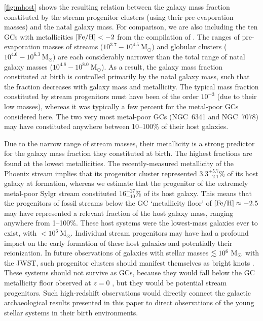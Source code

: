 \documentclass[twocolumn]{aastex63}
\newcommand{\msun}{\ensuremath{\textrm{M}_\odot}}
\begin{document}
\autoref{fig:mhost} shows the resulting relation between the galaxy mass fraction constituted by the stream progenitor clusters (using their pre-evaporation masses) and the natal galaxy mass.
For comparison, we are also including the ten GCs with metallicities $[{\rm Fe}/{\rm H}]<-2$ from the compilation of \citet{kruijssen19e}.
The ranges of pre-evaporation masses of streams ($10^{3.7}{-}10^{4.5}~\msun$) and globular clusters ($10^{4.6}{-}10^{6.3}~\msun$) are each considerably narrower than the total range of natal galaxy masses ($10^{4.8}{-}10^{8.0}~\msun$).
As a result, the galaxy mass fraction constituted at birth is controlled primarily by the natal galaxy mass, such that the fraction decreases with galaxy mass and metallicity.
The typical mass fraction constituted by stream progenitors must have been of the order $10^{-3}$ (due to their low masses), whereas it was typically a few percent for the metal-poor GCs considered here. The two very most metal-poor GCs (NGC~6341 and NGC~7078) may have constituted anywhere between 10--100\% of their host galaxies.

Due to the narrow range of stream masses, their metallicity is a strong predictor for the galaxy mass fraction they constituted at birth.
The highest fractions are found at the lowest metallicities.
The recently-measured metallicity of the Phoenix stream \citep{wan20} implies that its progenitor cluster represented $3.3_{-2.1}^{+5.7}$\% of its host galaxy at formation, whereas we estimate that the progenitor of the extremely metal-poor Sylgr stream \citep{ibata:2019,roederer:2019} constituted $16_{-10}^{+27}$\% of its host galaxy.
This means that the progenitors of fossil streams below the GC `metallicity floor' \citep{beasley:2019,kruijssen19c} of $[{\rm Fe}/{\rm H}]\approx-2.5$ may have represented a relevant fraction of the host galaxy mass, ranging anywhere from 1--100\%.
These host systems were the lowest-mass galaxies ever to exist, with $<10^6~\msun$.
Individual stream progenitors may have had a profound impact on the early formation of these host galaxies and potentially their reionization.
In future observations of galaxies with stellar masses $\la10^6~\msun$ with the JWST, such progenitor clusters should manifest themselves as bright knots \citep[e.g.][]{pfeffer19}.
These systems should not survive as GCs, because they would fall below the GC metallicity floor observed at $z=0$ \citep[except under rare circumstances, see][]{larsen20}, but they would be potential stream progenitors.
Such high-redshift observations would directly connect the galactic archaeological results presented in this paper to direct observations of the young stellar systems in their birth environments.
\end{document}
